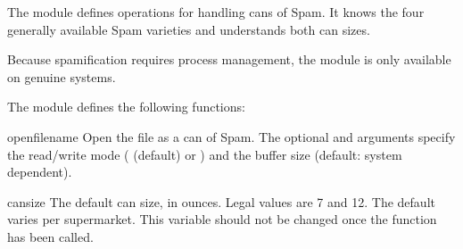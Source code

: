 
The  module defines operations for handling cans of Spam.
It knows the four generally available Spam varieties and understands
both can sizes.

Because spamification requires \UNIX{} process management, the module
is only available on genuine \UNIX{} systems.



The  module defines the following functions:


\begin{funcdesc}{open}{filename}
Open the file  as a can of Spam.  The optional
 and  arguments specify the read/write mode
( (default) or ) and the buffer size (default:
system dependent).
\end{funcdesc}


\begin{datadesc}{cansize}
The default can size, in ounces.  Legal values are 7 and 12.  The
default varies per supermarket.  This variable should not be changed
once the  function has been called.
\end{datadesc}

